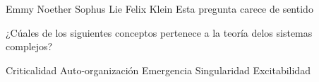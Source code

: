 \documentclass[addpoints]{exam}
\begin{document}
\begin{questions}
\begin{oneparchoices}
    \choice Emmy Noether
    \choice Sophus Lie
    \choice Felix Klein
    \choice Esta pregunta carece de sentido    
\end{oneparchoices}

\bonusquestion[1] ¿Cúales de los siguientes conceptos pertenece a la teoría delos sistemas complejos?

\begin{checkboxes}
    \choice Criticalidad
    \choice Auto-organización
    \choice Emergencia
    \choice Singularidad
    \choice Excitabilidad
\end{checkboxes}

\end{questions}

\begin{center}
    \combinedgradetable[h][questions]
\end{center}
\clearpage
\end{document}
